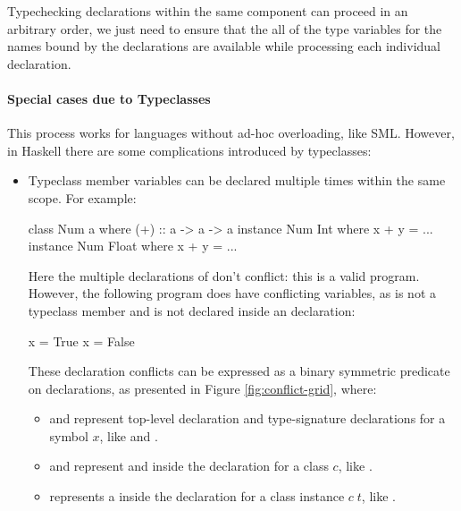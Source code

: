 \documentclass[dissertation.tex]{subfiles}
\begin{document}
{{        Typechecking declarations within the same component can proceed in an arbitrary order, we just need to ensure that the all of the type variables for the names bound by the declarations are available while processing each individual declaration.

        \paragraph*{Special cases due to Typeclasses}

        This process works for languages without ad-hoc overloading, like SML. However, in Haskell there are some complications introduced by typeclasses:

        \begin{itemize}
        \item
        {
            
            Typeclass member variables can be declared multiple times within the same scope. For example:
            
            \begin{haskellfigure}
            class Num a where
                (+) :: a -> a -> a
            instance Num Int where
                x + y = ...
            instance Num Float where
                x + y = ...
            \end{haskellfigure}

            Here the multiple declarations of \haskell{(+)} don't conflict: this is a valid program. However, the following program does have conflicting variables, as  is not a typeclass member and is not declared inside an  declaration:

            \begin{haskellfigure}
            x = True
            x = False
            \end{haskellfigure}

            These declaration conflicts can be expressed as a binary symmetric predicate on declarations, as presented in Figure \ref{fig:conflict-grid}, where:

            \begin{itemize}
            \item
            {
                 and  represent top-level declaration and type-signature declarations for a symbol \(x\), like  and .
            }
            \item
            {
                 and  represent  and  inside the declaration for a class \(c\), like .
            }
            \item
            {
                 represents a  inside the declaration for a class instance \(c\;t\), like .
            }
            \end{itemize}

}
\end{itemize}}}
\end{document}
